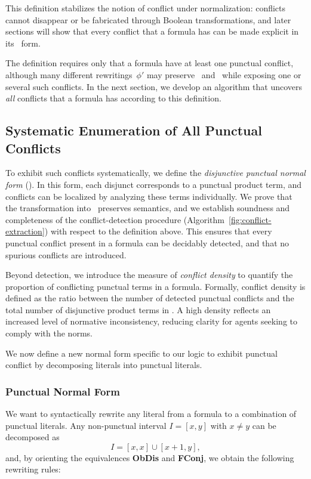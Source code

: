 This definition stabilizes the notion of conflict under normalization: conflicts cannot disappear or be fabricated through Boolean transformations, and later sections will show that every conflict that a formula has can be made explicit in its \dpnf\ form.

The definition requires only that a formula have at least one punctual conflict, although many different rewritings~$\phi'$ may preserve \LUCO\ and \LAP\ while exposing one or several such conflicts. In the next section, we develop an algorithm that uncovers \emph{all} conflicts that a formula has according to this definition.



\subsection{Systematic Enumeration of All Punctual Conflicts}

To exhibit such conflicts systematically, we define the \emph{disjunctive punctual normal form} (\dpnf). 
In this form, each disjunct corresponds to a punctual product term, and conflicts can be localized 
by analyzing these terms individually. 
We prove that the transformation into \dpnf\ preserves semantics, and we establish 
soundness and completeness of the conflict-detection procedure 
(Algorithm~\ref{fig:conflict-extraction}) with respect to the definition above. 
This ensures that every punctual conflict present in a formula can be decidably detected, 
and that no spurious conflicts are introduced.

Beyond detection, we introduce the measure of \emph{conflict density} to quantify the 
proportion of conflicting punctual terms in a formula. 
Formally, conflict density is defined as the ratio between the number of detected punctual conflicts 
and the total number of disjunctive product terms in \dpnf. 
A high density reflects an increased level of normative inconsistency, 
reducing clarity for agents seeking to comply with the norms. 


We now define a new normal form specific to our logic to exhibit punctual conflict by decomposing literals into punctual literals.

\subsubsection{Punctual Normal Form}\label{subsec:pnf}

We want to syntactically rewrite any literal from a formula to a combination of punctual literals. 
Any non-punctual interval \(I = [x,y]\) with \(x \neq y\) can be decomposed as
\[
I = [x,x] \cup [x{+}1,y],
\]
and, by orienting the equivalences \textbf{ObDis} and \textbf{FConj}, we obtain the following rewriting rules:

